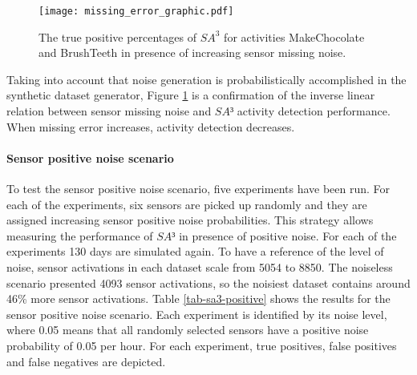\begin{figure}[htbp]
\centering
\texttt{[image: missing\_error\_graphic.pdf]}
    \caption{The true positive percentages of $SA^3$ for activities MakeChocolate and BrushTeeth in presence of increasing sensor missing noise.}
    \label{fig:sa3-missing}
\end{figure}

Taking into account that noise generation is probabilistically accomplished in the synthetic dataset generator, Figure \ref{fig:sa3-missing} is a confirmation of the inverse linear relation between sensor missing noise and $SA³$ activity detection performance. When missing error increases, activity detection decreases. 

\paragraph*{Sensor positive noise scenario}

To test the sensor positive noise scenario, five experiments have been run. For each of the experiments, six sensors are picked up randomly and they are assigned increasing sensor positive noise probabilities. This strategy allows measuring the performance of $SA³$ in presence of positive noise. For each of the experiments 130 days are simulated again. To have a reference of the level of noise, sensor activations in each dataset scale from 5054 to 8850. The noiseless scenario presented 4093 sensor activations, so the noisiest dataset contains around 46\% more sensor activations. Table \ref{tab-sa3-positive} shows the results for the sensor positive noise scenario. Each experiment is identified by its noise level, where 0.05 means that all randomly selected sensors have a positive noise probability of 0.05 per hour. For each experiment, true positives, false positives and false negatives are depicted.

